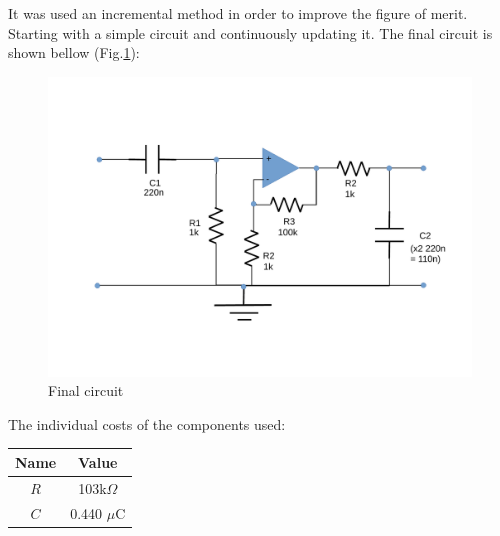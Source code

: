 It was used an incremental method in order to improve the figure of merit. Starting with a simple circuit and continuously updating it. The final circuit is shown bellow (Fig.\ref{fig:circuito}): \par

\begin{figure}[H]
\centering
\includegraphics[width=0.9\linewidth]{circuito}
\caption{Final circuit}
\label{fig:circuito}
\end{figure}

The individual costs of the components used: 

\begin{center}
  \begin{tabular}{ | c | c | }
    \hline    
    {\bf Name} & {\bf Value} \\ \hline
    $R$ & 103k$\Omega$ \\ \hline 
    $C$ & 0.440 $\mu$C \\ 
    \hline
  \end{tabular}
\end{center}

\newpage